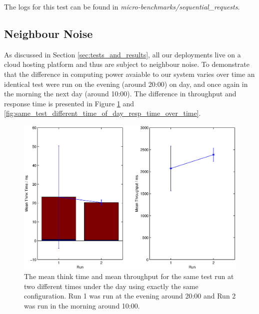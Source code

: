 \documentclass{article}
\begin{document}
 
        The logs for this test can be found in \textit{micro-benchmarks/sequential\_requests}.
        \subsection{Neighbour Noise} 
        As discussed in Section \ref{sec:tests_and_results}, all our deployments live on a cloud hosting platform and thus are subject to neighbour noise. To demonstrate that the difference in computing power avaiable to our system varies over time an identical test were run on the evening (around 20:00) on day, and once again in the morning the next day (around 10:00). The difference in throughput and response time is presented in Figure \ref{fig:same_test_different_time_of_day} and \ref{fig:same_test_different_time_of_day_resp_time_over_time}.

    
        \begin{figure}[H]
                \centerline{\includegraphics[scale=0.50]{same_test_different_time_of_day}}
                \caption{The mean think time and mean throughput for the same test run at two different times under the day using exactly the same configuration. Run 1 was run at the evening around 20:00 and Run 2 was run in the morning around 10:00.}
                \label{fig:same_test_different_time_of_day}
        \end{figure}
    
\end{document}
